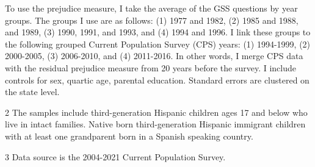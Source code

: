 \begin{table}[H]
{\begin{threeparttable}
\begin{tablenotes}
{                      To use the prejudice measure, I take the average of the GSS questions by year groups. The groups I use are as follows:
                      (1) 1977 and 1982, (2) 1985 and 1988, and 1989, (3) 1990, 1991, and 1993, and (4) 1994 and 1996. I link these groups to the following
                      grouped Current Population Survey (CPS) years: (1) 1994-1999, (2) 2000-2005, (3) 2006-2010, and (4) 2011-2016.
                      In other words, I merge CPS data with the residual prejudice measure from 20 years before the survey.
                      I include controls for sex, quartic age, parental education.
                      Standard errors are clustered on the state level.}
\item[2] \footnotesize{The samples include third-generation Hispanic children ages 17 and below who live in intact families. 
                      Native born third-generation Hispanic 
                      immigrant children with at least one grandparent born in a Spanish speaking 
                      country.}
\item[3] \footnotesize{Data source is the 2004-2021 Current Population Survey.}
\end{tablenotes}
\end{threeparttable}}
\end{table}
